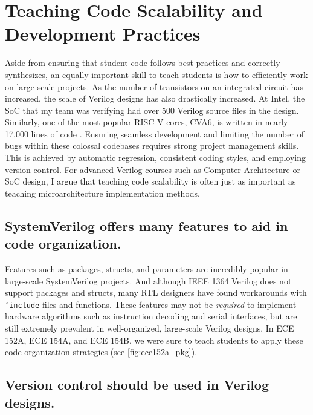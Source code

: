 
\chapter{Teaching Code Scalability and Development Practices}
\label{chapter:scalability}

Aside from ensuring that student code follows best-practices and correctly synthesizes, an equally important skill to teach students is how to efficiently work on large-scale projects. As the number of transistors on an integrated circuit has increased, the scale of Verilog designs has also drastically increased. At Intel, the SoC that my team was verifying had over 500 Verilog source files in the design. Similarly, one of the most popular RISC-V cores, CVA6, is written in nearly 17,000 lines of code \cite{cva6}. Ensuring seamless development and limiting the number of bugs within these colossal codebases requires strong project management skills. This is achieved by automatic regression, consistent coding styles, and employing version control. For advanced Verilog courses such as Computer Architecture or SoC design, I argue that teaching code scalability is often just as important as teaching microarchitecture implementation methods.

\section{SystemVerilog offers many features to aid in code organization.}



Features such as packages, structs, and parameters are incredibly popular in large-scale SystemVerilog projects. And although IEEE 1364 Verilog does not support packages and structs, many RTL designers have found workarounds with \texttt{`include} files and functions. \cite{lowRISCstyleguides, zachjssv2vGitHub} These features may not be \emph{required} to implement hardware algorithms such as instruction decoding and serial interfaces, but are still extremely prevalent in well-organized, large-scale Verilog designs. In ECE 152A, ECE 154A, and ECE 154B, we were sure to teach students to apply these code organization strategies (see \autoref{fig:ece152a_pkg}).

\section{Version control should be used in Verilog designs.}

